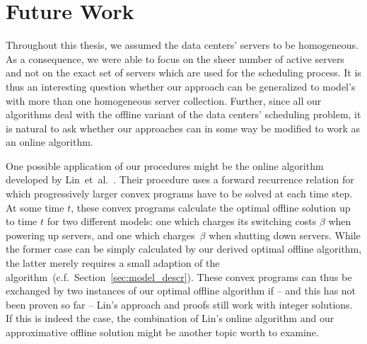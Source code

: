 \section{Future Work}
Throughout this thesis, we assumed the data centers' servers to be homogeneous. As a consequence, we were able to focus on the sheer number of active servers and not on the exact set of servers which are used for the scheduling process. It is thus an interesting question whether our approach can be generalized to model's with more than one homogeneous server collection.
Further, since all our algorithms deal with the offline variant of the data centers' scheduling problem, it is natural to ask whether our approaches can in some way be modified to work as an online algorithm. 

One possible application of our procedures might be the online algorithm developed by Lin~et~al.~\parencite{dyn-right-sizing}. Their procedure uses a forward recurrence relation for which progressively larger convex programs have to be solved at each time step. At some time $t$, these convex programs calculate the optimal offline solution up to time $t$ for two different models: one which charges its switching costs $\beta$ when powering up servers, and one which charges~$\beta$ when shutting down servers. While the former case can be simply calculated by our derived optimal offline algorithm, the latter merely requires a small adaption of the algorithm~(c.f.\ Section~\ref{sec:model_descr}). These convex programs can thus be exchanged by two instances of our optimal offline algorithm if -- and this has not been proven so far -- Lin's approach and proofs still work with integer solutions. If this is indeed the case, the combination of Lin's online algorithm and our approximative offline solution might be another topic worth to examine.
